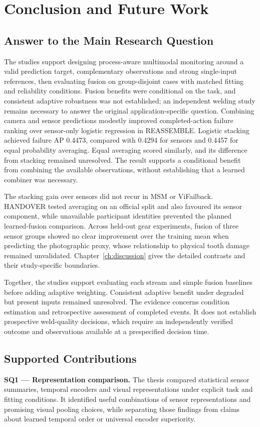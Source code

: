 \chapter{Conclusion and Future Work}
\label{ch:conclusion}

\section{Answer to the Main Research Question}
The studies support designing process-aware multimodal monitoring around a valid
prediction target, complementary observations and strong single-input references,
then evaluating fusion on group-disjoint cases with matched fitting and reliability
conditions. Fusion benefits were conditional on the task, and consistent adaptive
robustness was not established; an independent welding study remains necessary to
answer the original application-specific question.
Combining camera and sensor predictions modestly improved completed-action failure
ranking over sensor-only logistic regression in REASSEMBLE. Logistic stacking achieved failure AP
0.4473, compared with 0.4294 for sensors and 0.4457 for equal probability averaging.
Equal averaging scored similarly, and its difference from stacking remained unresolved.
The result supports a conditional benefit from combining the available observations,
without establishing that a learned combiner was necessary.

The stacking gain over sensors did not recur in MSM or ViFailback. HANDOVER tested
averaging on an official split and also favoured its sensor component, while unavailable
participant identities prevented the planned learned-fusion comparison. Across held-out
gear experiments, fusion of three sensor groups showed no clear improvement over the
training mean when predicting the photographic proxy, whose relationship to physical
tooth damage remained unvalidated.
Chapter~\ref{ch:discussion} gives the detailed contrasts and their study-specific
boundaries.

Together, the studies support evaluating each stream and simple fusion baselines before
adding adaptive weighting. Consistent adaptive benefit under degraded but present inputs
remained unresolved. The evidence concerns condition estimation and retrospective
assessment of completed events. It does not establish prospective weld-quality
decisions, which require an independently verified outcome and observations available
at a prespecified decision time.

\section{Supported Contributions}
\textbf{SQ1 --- Representation comparison.} The thesis compared statistical sensor
summaries, temporal encoders and visual representations under explicit task and fitting
conditions. It identified useful combinations of sensor representations and promising
visual pooling choices, while separating those findings from claims about learned
temporal order or universal encoder superiority.

